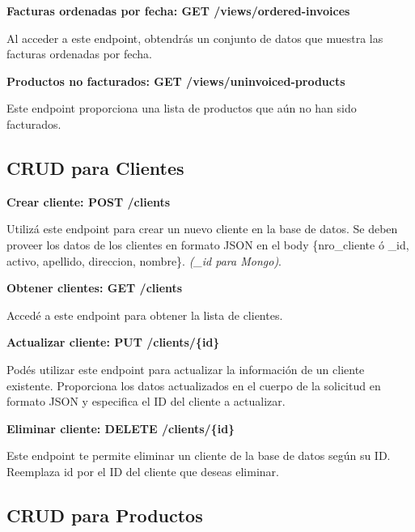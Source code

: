 \documentclass[a4paper,12pt]{article}
\begin{document}
	\textbf{Facturas ordenadas por fecha: GET /views/ordered-invoices}
	
	\bigskip
	
	Al acceder a este endpoint, obtendrás un conjunto de datos que muestra las facturas ordenadas por fecha.
	
	\bigskip
	
	\textbf{Productos no facturados: GET /views/uninvoiced-products}
	
	\bigskip
	
	Este endpoint proporciona una lista de productos que aún no han sido facturados.
	
	
	\subsection{CRUD para Clientes}
	
	\textbf{Crear cliente: POST /clients}
	
	\bigskip
	
	Utilizá este endpoint para crear un nuevo cliente en la base de datos. Se deben proveer los datos de los clientes en formato JSON en el body \{nro\_cliente ó \_id, activo, apellido, direccion, nombre\}.
	\textit{(\_id para Mongo)}.
	
	\bigskip
	
	\textbf{Obtener clientes: GET /clients}
	
	\bigskip
	
	Accedé a este endpoint para obtener la lista de clientes.
	
	\bigskip
	\bigskip
	
	\textbf{Actualizar cliente: PUT /clients/\{id\}}
	
	\bigskip
	
	Podés utilizar este endpoint para actualizar la información de un cliente existente. Proporciona los datos actualizados en el cuerpo de la solicitud en formato JSON y especifica el ID del cliente a actualizar.
	
	\bigskip
	
	\textbf{Eliminar cliente: DELETE /clients/\{id\}}
	
	\bigskip
	
	Este endpoint te permite eliminar un cliente de la base de datos según su ID. Reemplaza {id} por el ID del cliente que deseas eliminar.
	
	
	\subsection{CRUD para Productos}
	
\end{document}
